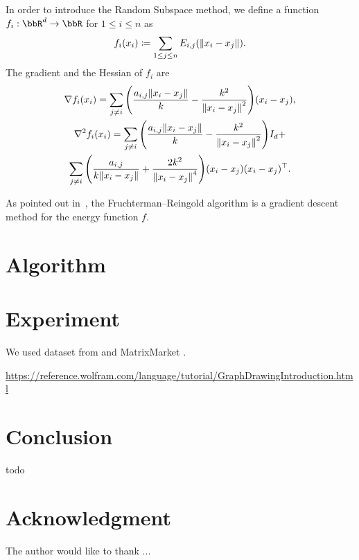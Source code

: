 \documentclass[journal]{IEEEtran}
\newcommand{\defeq}{\coloneqq}
\begin{document}
In order to introduce the Random Subspace method, we define a function $f_i: \bbR^{d} \to \bbR$ for $1 \leq i \leq n$ as
\begin{equation*}
  f_i(x_i) \defeq \sum_{1 \leq j \leq n} E_{i,j}(\norm{x_i - x_j}).
\end{equation*}
The gradient and the Hessian of $f_i$ are
\begin{gather*}
  \nabla f_i(x_i) = \sum_{j \neq i} \qty(\frac{a_{i,j}\norm{x_i-x_j}}{k} - \frac{k^2}{\norm{x_i - x_j}^2}) (x_i-x_j), \\
  \nabla^2 f_i(x_i) = \sum_{j \neq i} \qty(\frac{a_{i,j}\norm{x_i-x_j}}{k} - \frac{k^2}{\norm{x_i - x_j}^2}) I_d +      \\
  \sum_{j \neq i} \qty(\frac{a_{i,j}}{k \norm{x_i-x_j}} + \frac{2k^2}{\norm{x_i - x_j}^4}) (x_i - x_j)(x_i - x_j)^\top.
\end{gather*}

As pointed out in~\cite{tunkelang1999numerical},
the Fruchterman--Reingold algorithm is a gradient descent method for the energy function $f$.


\section{Algorithm} \label{sec:algorithm}

\section{Experiment} \label{sec:experiment}

We used dataset from \cite{davis2011university} and MatrixMarket \cite{boisvertMatrixMarketWeb1997}.

\url{https://reference.wolfram.com/language/tutorial/GraphDrawingIntroduction.html}

\section{Conclusion} \label{sec:conclusion}

todo

\section*{Acknowledgment}

The author would like to thank ...

\end{document}
